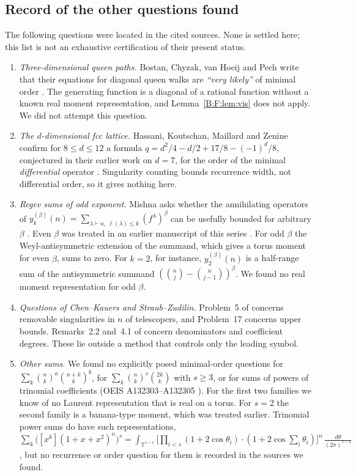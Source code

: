 \documentclass[11pt,a4paper]{article}
\theoremstyle{definition}
\theoremstyle{remark}
\numberwithin{equation}{section}
\begin{document}
\subsection{Record of the other questions found}\label{B:F:ssec:record}

The following questions were located in the cited sources. None is settled here; this list is not an exhaustive certification of their present status.
\begin{enumerate}
\item \emph{Three-dimensional queen paths.} Bostan, Chyzak, van Hoeij and
Pech write that their equations for diagonal queen walks are \emph{``very
likely''} of minimal order \cite{R058}. The generating function is a
diagonal of a rational function without a known real moment representation,
and Lemma~\ref{B:F:lem:vis} does not apply. We did not attempt this question.
\item \emph{The $d$-dimensional fcc lattice.} Hassani, Koutschan, Maillard
and Zenine confirm for $8\le d\le12$ a formula
$q=d^2/4-d/2+17/8-(-1)^d/8$, conjectured in their earlier work on $d=7$,
for the order of the minimal \emph{differential} operator \cite{R061}. Singularity counting bounds
recurrence width, not differential order, so it gives nothing here.
\item \emph{Regev sums of odd exponent.} Mishna asks whether the annihilating
operators of $y^{(\beta)}_k(n)=\sum_{\lambda\vdash n,\ \ell(\lambda)\le k}
(f^\lambda)^\beta$ can be usefully bounded for arbitrary $\beta$
\cite[\S4]{R062}. Even $\beta$ was treated in an earlier manuscript of this
series \cite{R020}. For odd $\beta$ the Weyl-antisymmetric extension of the summand,
which gives a torus moment for even $\beta$, sums to zero. For $k=2$, for
instance, $y^{(\beta)}_2(n)$ is a half-range sum of the antisymmetric summand
$(\binom nj-\binom n{j-1})^\beta$. We found no real moment representation
for odd $\beta$.
\item \emph{Questions of Chen--Kauers and Straub--Zudilin.} Problem~5 of
\cite{R057} concerns removable singularities in $n$ of telescopers, and
Problem~17 concerns upper bounds. Remarks~2.2 and~4.1 of \cite{R002} concern
denominators and coefficient degrees. These lie outside a method that
controls only the leading symbol.
\item \emph{Other sums.} We found no explicitly posed minimal-order
questions for $\sum_k\binom nk^a\binom{n+k}k^b$, for
$\sum_k\binom nk^s\binom{2k}k$ with $s\ge3$, or for sums of powers of
trinomial coefficients (OEIS A132303--A132305 \cite{R063}). For the first
two families we know of no Laurent representation that is real on a torus.
For $s=2$ the second family is a banana-type moment, which was treated
earlier. Trinomial power sums do have such representations,
$\sum_k\bigl([x^k](1+x+x^2)^n\bigr)^s=\int_{\mathbb T^{s-1}}\bigl[\prod_{i<s}
(1+2\cos\theta_i)\cdot(1+2\cos\textstyle\sum_i\theta_i)\bigr]^n\,\frac{d\theta}{(2\pi)^{s-1}}$, but no
recurrence or order question for them is recorded in the sources we found.
\end{enumerate}
\clearpage
\end{document}
